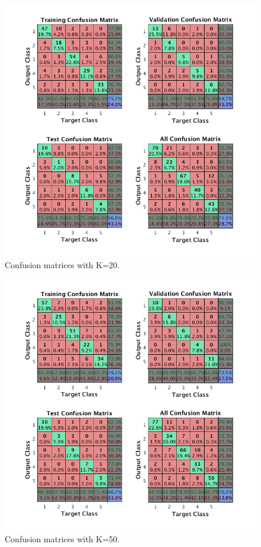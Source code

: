 \documentclass{article}
\begin{document}
\begin{figure}[h]
\centering
\includegraphics[scale=0.5]{Figures/Metrics/conf_k20}
\caption{Confusion matrices with K=20.}
\label{fig:k20}
\end{figure}
\begin{figure}[h]
\centering
\includegraphics[scale=0.5]{Figures/Metrics/conf_k50}
\caption{Confusion matrices with K=50.}
\label{fig:k50}
\end{figure}
\end{document}

